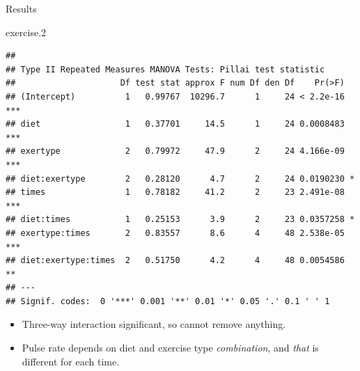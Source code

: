 \documentclass[
  ignorenonframetext,
]{beamer}
\newenvironment{Shaded}{\begin{snugshade}}{\end{snugshade}}
\newcommand{\FloatTok}[1]{\textcolor[rgb]{0.00,0.00,0.81}{#1}}
\newcommand{\NormalTok}[1]{#1}
\begin{document}
\begin{frame}[fragile]{Results}
\protect\hypertarget{results-1}{}

\scriptsize

\begin{Shaded}
\begin{Highlighting}[]
\NormalTok{exercise}\FloatTok{.2}
\end{Highlighting}
\end{Shaded}

\begin{verbatim}
## 
## Type II Repeated Measures MANOVA Tests: Pillai test statistic
##                     Df test stat approx F num Df den Df    Pr(>F)    
## (Intercept)          1   0.99767  10296.7      1     24 < 2.2e-16 ***
## diet                 1   0.37701     14.5      1     24 0.0008483 ***
## exertype             2   0.79972     47.9      2     24 4.166e-09 ***
## diet:exertype        2   0.28120      4.7      2     24 0.0190230 *  
## times                1   0.78182     41.2      2     23 2.491e-08 ***
## diet:times           1   0.25153      3.9      2     23 0.0357258 *  
## exertype:times       2   0.83557      8.6      4     48 2.538e-05 ***
## diet:exertype:times  2   0.51750      4.2      4     48 0.0054586 ** 
## ---
## Signif. codes:  0 '***' 0.001 '**' 0.01 '*' 0.05 '.' 0.1 ' ' 1
\end{verbatim}

\normalsize

\begin{itemize}
\item
  Three-way interaction significant, so cannot remove anything.
\item
  Pulse rate depends on diet and exercise type \emph{combination}, and
  \emph{that} is different for each time.
\end{itemize}

\end{frame}
\end{document}
